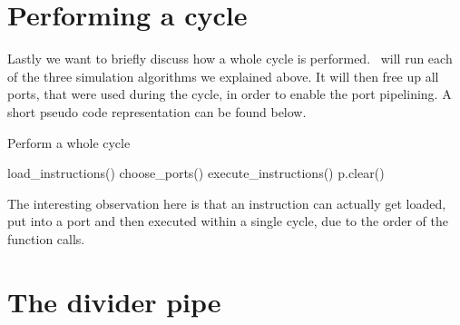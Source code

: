 \section{Performing a cycle}

Lastly we want to briefly discuss how a whole cycle is performed. \suaca\ will run each of the three simulation algorithms we explained above. It will then free up all ports, that were used during the cycle, in order to enable the port pipelining. A short pseudo code representation can be found below.

\begin{algorithm}[H]
    \SetAlgoLined
    \caption{Perform a whole cycle}
    load\_instructions()\;
    choose\_ports()\;
    execute\_instructions()\;
     {
        p.clear()\;
    }
\end{algorithm}

The interesting observation here is that an instruction can actually get loaded, put into a port and then executed within a single cycle, due to the order of the function calls.


\section{The divider pipe}
\label{sec:dividerpipe}



